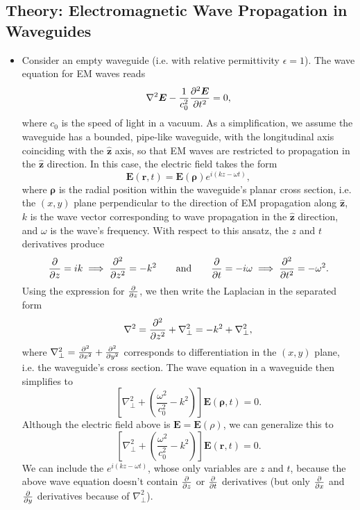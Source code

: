 \documentclass[11pt, a4paper]{article}
\newcommand{\eqtext}[1]{\qquad \text{#1} \qquad}
\renewcommand{\vec}[1]{\bm{#1}} %
\newcommand{\uvec}[1]{\hat{\vec{#1}}} %
\renewcommand{\r}{\vec{r}}
\newcommand{\rh}{\vec{\rho}}
\newcommand{\E}{\vec{E}}  %
\newcommand{\e}{\epsilon}
\renewcommand{\laplacian}{\nabla^{2}}
\begin{document}
\subsection{Theory: Electromagnetic Wave Propagation in Waveguides}
\begin{itemize}
	\item Consider an empty waveguide (i.e. with relative permittivity $ \e = 1 $). The wave equation for EM waves reads
	\begin{equation*}
		\laplacian \E - \frac{1}{c_{0}^{2}}\pdv[2]{\E}{t} = 0,
	\end{equation*}
	where $ c_{0} $ is the speed of light in a vacuum. As a simplification, we assume the waveguide has a bounded, pipe-like waveguide, with the longitudinal axis coinciding with the $ \uvec{z} $ axis, so that EM waves are restricted to propagation in the $ \uvec{z} $ direction. In this case, the electric field takes the form
	\begin{equation*}
		\E(\r, t) = \E(\rh) e^{i(kz - \omega t)},
	\end{equation*}
	where $ \rh $ is the radial position within the waveguide's planar cross section, i.e. the $ (x, y) $ plane perpendicular to the direction of EM propagation along $ \uvec{z} $, $ k $ is the wave vector corresponding to wave propagation in the $ \uvec{z} $ direction, and $ \omega $ is the wave's frequency. With respect to this ansatz, the $ z $ and $ t $ derivatives produce
	\begin{equation*}
		\pdv{z} = ik \implies \pdv[2]{}{z} = -k^{2} \eqtext{and} \pdv{t} = -i\omega \implies \pdv[2]{}{t} = - \omega^{2}.
	\end{equation*}
	Using the expression for $ \pdv{z} $, we then write the Laplacian in the separated form	
	\begin{equation*}
		\laplacian = \pdv[2]{}{z} + \nabla_{\perp}^{2} = -k^{2}  + \nabla_{\perp}^{2},
	\end{equation*}
	where $ \nabla_{\perp}^{2} = \pdv[2]{}{x} + \pdv[2]{}{y} $ corresponds to differentiation in the $ (x, y) $ plane, i.e. the waveguide's cross section. The wave equation in a waveguide then simplifies to 
	\begin{equation*}
		 \left[\nabla_{\perp}^{2} + \left(\frac{\omega^{2}}{c_{0}^{2}} - k^{2}\right)\right]\E(\rh, t) = 0.
	\end{equation*}
	Although the electric field above is $ \E = \E(\rho) $, we can generalize this to
	\begin{equation*}
		 \left[\nabla_{\perp}^{2} + \left(\frac{\omega^{2}}{c_{0}^{2}} - k^{2}\right)\right]\E(\r, t) = 0.
	\end{equation*}
	We can include the $ e^{i(kz - \omega t)} $, whose only variables are $ z $ and $ t $, because the above wave equation doesn't contain $ \pdv{z} $ or $ \pdv{t} $ derivatives (but only $ \pdv{x} $ and $ \pdv{y} $ derivatives because of $ \laplacian_{\perp} $).
	

\end{itemize}
\end{document}
